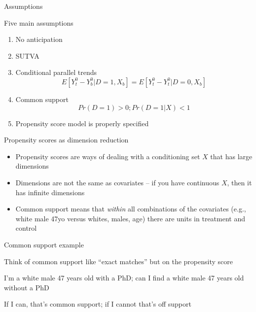 \documentclass{beamer}
\begin{document}
\begin{frame}{Assumptions}

Five main assumptions

\begin{enumerate}
\item No anticipation 
\item SUTVA
\item Conditional parallel trends $$E[Y^0_t - Y^0_b|D=1,X_b] = E[Y^0_t - Y^0_t | D=0, X_b]$$ 
\item Common support $$Pr(D=1)>0; Pr(D=1|X)<1$$ 
\item Propensity score model is properly specified 
\end{enumerate}

\end{frame}

\begin{frame}{Propensity scores as dimension reduction}

\begin{itemize}

\item Propensity scores are ways of dealing with a conditioning set $X$ that has large dimensions
\item Dimensions are not the same as covariates -- if you have continuous $X$, then it has infinite dimensions
\item Common support means that \emph{within} all combinations of the covariates (e.g., white male 47yo versus whites, males, age) there are units in treatment and control

\end{itemize}

\end{frame}

\begin{frame}{Common support example}

Think of common support like ``exact matches'' but on the propensity score

\bigskip

I'm a white male 47 years old with a PhD; can I find a white male 47 years old without a PhD

\bigskip

If I can, that's common support; if I cannot that's off support

\end{frame}
\end{document}
